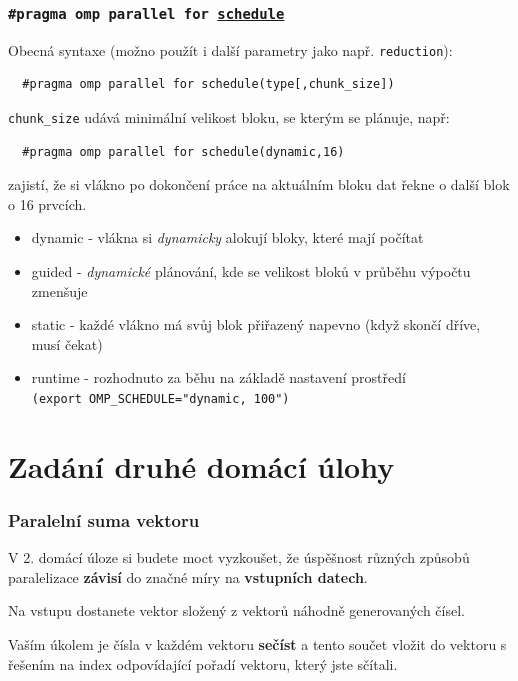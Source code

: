 \documentclass[usenames,dvipsnames,9pt]{beamer}
\begin{document}
\begin{frame}[fragile]
  \frametitle{\texttt{\#pragma omp parallel for \underline{schedule}}}
  Obecná syntaxe (možno použít i další parametry jako např. \texttt{reduction}):
  \begin{verbatim}
  #pragma omp parallel for schedule(type[,chunk_size])
  \end{verbatim}

  \pause

  \texttt{chunk\_size} udává minimální velikost bloku, se kterým se plánuje, např:
  \begin{verbatim}
  #pragma omp parallel for schedule(dynamic,16)
  \end{verbatim}
  zajistí, že si vlákno po dokončení práce na aktuálním bloku dat řekne o další blok o 16 prvcích.

  \pause

  \begin{itemize}
    \item dynamic - vlákna si \emph{dynamicky} alokují bloky, které mají počítat
    \item guided - \emph{dynamické} plánování, kde se velikost bloků v průběhu výpočtu zmenšuje
    \item static - každé vlákno má svůj blok přiřazený napevno (když skončí dříve, musí čekat)
    \item runtime - rozhodnuto za běhu na základě nastavení prostředí \\ {\tt (export OMP\_SCHEDULE="dynamic, 100")}
  \end{itemize}
\end{frame}

\section{Zadání druhé domácí úlohy}


\begin{frame}
  \frametitle{Paralelní suma vektoru}
  
V 2. domácí úloze si budete moct vyzkoušet, že úspěšnost různých způsobů paralelizace {\bf závisí} do značné míry na {\bf vstupních datech}.

\vspace{1.5em}

Na vstupu dostanete vektor složený z vektorů náhodně generovaných čísel. 

\vspace{1.5em}

Vaším úkolem je čísla v každém vektoru {\bf sečíst} a tento součet vložit do vektoru s řešením na index odpovídající pořadí vektoru, který jste sčítali.
   
  
  

\end{frame}
\end{document}
